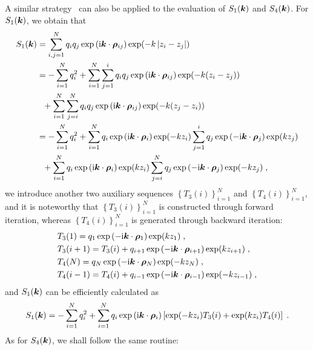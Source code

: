 A similar strategy~\cite{jiang2021approximating, gan2024fast} can also be applied to the evaluation of $S_1(\bm{k})$ and $S_4(\bm{k})$. For $S_1(\bm{k})$, we obtain that 
\begin{align*}
S_1(\bm{k})&=\sum_{i,j=1}^Nq_iq_j  \exp{(\mathrm{i} \boldsymbol{k} \cdot \boldsymbol{\rho}_{ij})}\exp(-k\left\lvert z_i-z_j\right\rvert)\\
&=-\sum_{i=1}^Nq_i^2+\sum_{i=1}^N \sum_{j=1}^iq_iq_j  \exp{(\mathrm{i} \boldsymbol{k} \cdot \boldsymbol{\rho}_{ij})}\exp(-k(z_i-z_j))\\
&~~+\sum_{i=1}^N \sum_{j=i}^Nq_iq_j  \exp{(\mathrm{i} \boldsymbol{k} \cdot \boldsymbol{\rho}_{ij})}\exp(-k(z_j-z_i))\\
&= -\sum_{i=1}^Nq_i^2+\sum_{i=1}^N q_i\exp{(\mathrm{i} \boldsymbol{k} \cdot \boldsymbol{\rho}_{i})}\exp(-kz_i)\sum_{j=1}^iq_j\exp{(-\mathrm{i} \boldsymbol{k} \cdot \boldsymbol{\rho}_{j})}\exp(kz_j)\\
&~~+\sum_{i=1}^N q_i\exp{(\mathrm{i} \boldsymbol{k} \cdot \boldsymbol{\rho}_{i})}\exp(kz_i)\sum_{j=i}^Nq_j\exp{(-\mathrm{i} \boldsymbol{k} \cdot \boldsymbol{\rho}_{j})}\exp(-kz_j)\;,
\end{align*}
 we introduce another two auxiliary sequences  $\left\{T_3(i)\right\}_{i=1}^N$ and $\left\{T_4(i)\right\}_{i=1}^N$, and it is noteworthy that $\left\{T_3(i)\right\}_{i=1}^N$ is  constructed through forward iteration, whereas  $\left\{T_4(i)\right\}_{i=1}^N$   is generated through backward iteration:
\begin{align*}
    &T_3(1)=q_1\exp{(-\mathrm{i} \boldsymbol{k} \cdot \boldsymbol{\rho}_{1})}\exp(kz_1)\;,\\
    &T_3(i+1)=T_3(i)+q_{i+1}\exp{(-\mathrm{i} \boldsymbol{k} \cdot \boldsymbol{\rho}_{i+1})}\exp(kz_{i+1})\;,\\
    &T_4(N)=q_N\exp{(-\mathrm{i} \boldsymbol{k} \cdot \boldsymbol{\rho}_{N})}\exp(-kz_N)\;,\\
    &T_4(i-1)=T_4(i)+q_{i-1}\exp{(-\mathrm{i} \boldsymbol{k} \cdot \boldsymbol{\rho}_{i-1})}\exp(-kz_{i-1})\;,
\end{align*}
and
$S_1(\bm{k})$ can be efficiently calculated as
\[
S_1(\bm{k})= -\sum_{i=1}^Nq_i^2+ \sum_{i=1}^N q_i\exp{(\mathrm{i} \boldsymbol{k} \cdot \boldsymbol{\rho}_{i})}\left[\exp(-kz_i)T_3(i)+\exp(kz_i)T_4(i)\right]\;.
\]
As for $S_4(\bm{k})$, we shall follow the same routine:
